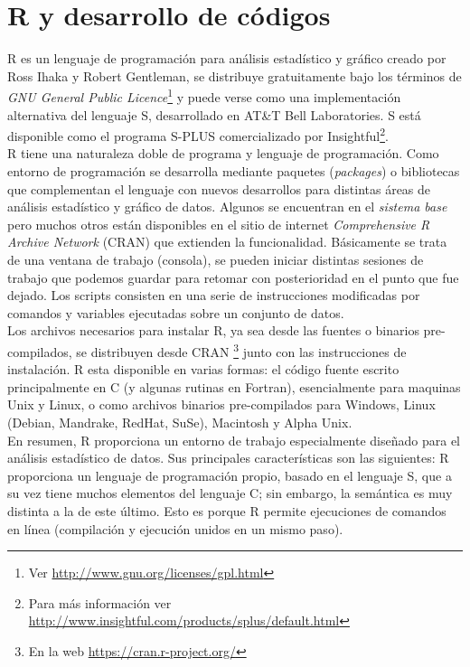 \def\verbarg{{\scriptsize\makebox[2ex]{\arabic{VerbboxLineNo}}}\hspace{2ex}}
\chapter{R y desarrollo de códigos}

R es un lenguaje de programación para análisis estadístico y gráfico creado por Ross Ihaka y Robert Gentleman\cite{Ihaka}, se distribuye gratuitamente bajo los términos de \emph{GNU General Public Licence}\footnote{Ver \url{http://www.gnu.org/licenses/gpl.html}} y puede verse como una implementación alternativa del lenguaje S, desarrollado en AT\&T Bell Laboratories. S está disponible como el programa S-PLUS comercializado por Insightful\footnote{Para más información ver \url{http://www.insightful.com/products/splus/default.html}}.\\

R tiene una naturaleza doble de programa y lenguaje de programación. Como entorno de programación se desarrolla mediante paquetes (\textit{packages}) o bibliotecas que complementan el lenguaje con nuevos desarrollos para distintas áreas de análisis estadístico y gráfico de datos. Algunos se encuentran en el \emph{sistema base} pero muchos otros están disponibles en el sitio de internet \emph{Comprehensive R Archive Network} (CRAN) que extienden la funcionalidad. Básicamente se trata de una ventana de trabajo (consola), se pueden iniciar distintas sesiones de trabajo que podemos guardar para retomar con posterioridad en el punto que fue dejado. Los scripts consisten en una serie de instrucciones modificadas por comandos y variables ejecutadas sobre un conjunto de datos\cite{principiantes}.\\

Los archivos necesarios para instalar R, ya sea desde las fuentes o binarios pre-compilados, se
distribuyen desde CRAN \footnote{En la web \url{https://cran.r-project.org/}} junto con las
instrucciones de instalación. R esta disponible en varias formas: el código fuente escrito principalmente en C (y algunas rutinas en Fortran), esencialmente para maquinas Unix y Linux, o como archivos binarios pre-compilados para Windows, Linux (Debian, Mandrake, RedHat, SuSe), Macintosh y Alpha Unix.\\


En resumen, R proporciona un entorno de trabajo especialmente diseñado para el
análisis estadístico de datos. Sus principales características son las siguientes:
R proporciona un lenguaje de programación propio, basado en el lenguaje S, que a su vez tiene muchos elementos del lenguaje C; sin embargo, la semántica es muy distinta a la de este último. Esto es porque R permite ejecuciones de comandos en línea (compilación y ejecución unidos en un mismo paso).\\

